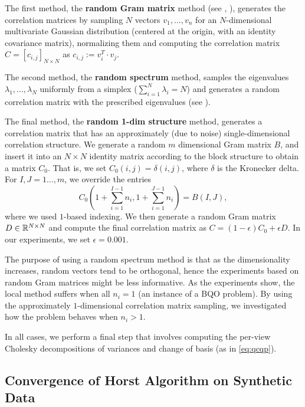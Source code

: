 The first method, the \textbf{random Gram matrix} method (see
\cite{Holmes:1991:RCM:105724.105730}, \cite{Bendel_Mickey_78}),
generates the correlation matrices by sampling $N$ vectors $v_1,
\ldots, v_n$ for an $N$-dimensional multivariate Gaussian
distribution (centered at the origin, with an identity covariance
matrix), normalizing them and computing the correlation matrix $C
= \left[c_{i,j}\right]_{N \times N}$ as $c_{i,j} := v_i^T \cdot v_j$.
\begin{sloppypar}
The second method, the \textbf{random spectrum} method,
samples the eigenvalues $\lambda_1,\ldots,\lambda_N$ uniformly
from a simplex ($\sum_{i=1}^{N} \lambda_i = N$) and generates a
random correlation matrix with the prescribed eigenvalues (see
\cite{Bendel_Mickey_78}).
\end{sloppypar}
The final method, the \textbf{random 1-dim structure} method,
generates a correlation matrix that has an approximately (due to
noise) single-dimensional correlation structure. We
generate a random $m$ dimensional Gram matrix $B$, and insert
it into an $N\times N$ identity matrix according to the block
structure to obtain a matrix $C_0$. That is, we set $C_0\left(i,j\right) = \delta\left(i,j\right)$,
where $\delta$ is the Kronecker delta. For $I,J = 1\ldots,m$, we
override the entries $$C_0\left(1+ \sum_{i=1}^{I-1}n_i, 1+
\sum_{i=1}^{J-1}n_i\right) = B\left(I,J\right),$$ where we used $1$-based
indexing. We then generate a random Gram matrix $D \in
\mathbb{R}^{N\times N}$ and compute the final correlation matrix as $C
= \left(1- \epsilon\right)C_0 + \epsilon D$.
In our experiments, we set $\epsilon = 0.001$.

The purpose of using a random spectrum method
is that as the dimensionality increases, random vectors tend to
be orthogonal, hence the experiments based on random Gram
matrices might be less informative. As the experiments show, the
local method suffers  when all $n_i = 1$ (an instance of a BQO problem).
By using the approximately $1$-dimensional correlation matrix sampling,
we investigated how the problem behaves when $n_i > 1$.

In all cases, we perform a final step that involves computing the
per-view Cholesky decompositions of variances and change of basis
(as in \ref{eq:qcqp}).

\subsection{Convergence of Horst Algorithm on Synthetic Data}\label{chap:experiments:horst}

